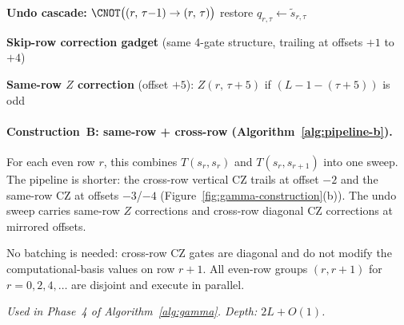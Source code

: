 \begin{algorithm}[t]
\begin{algorithmic}[1]
\Statex \hspace{2em}\textbf{Undo cascade:}
  $\CNOT\bigl((r,\,\tau{-}1) \to (r,\,\tau)\bigr)$
  \hfill restore $q_{r,\tau} \gets \tilde{s}_{r,\tau}$

\Statex \hspace{2em}\textbf{Skip-row correction gadget} (same 4-gate structure,
\Statex \hspace{3em} trailing at offsets $+1$ to $+4$)

\Statex \hspace{2em}\textbf{Same-row $Z$ correction} (offset $+5$):
  $Z(r,\,\tau{+}5)$ if $(L{-}1{-}(\tau{+}5))$ is odd
\end{algorithmic}
\end{algorithm}


\paragraph{Construction~B: same-row + cross-row (Algorithm~\ref{alg:pipeline-b}).}
For each even row $r$, this combines $T(s_r, s_r)$ and $T(s_r, s_{r+1})$ into one sweep.
The pipeline is shorter: the cross-row vertical CZ trails at offset $-2$ and the same-row CZ at offsets $-3$/$-4$ (Figure~\ref{fig:gamma-construction}(b)).
The undo sweep carries same-row $Z$ corrections and cross-row diagonal CZ corrections at mirrored offsets.

No batching is needed: cross-row CZ gates are diagonal and do not modify the computational-basis values on row $r{+}1$.
All even-row groups $(r, r{+}1)$ for $r = 0, 2, 4, \ldots$ are disjoint and execute in parallel.

\emph{Used in Phase~4 of Algorithm~\ref{alg:gamma}. Depth: $2L + O(1)$.}


